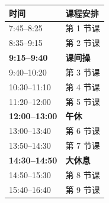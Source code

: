 \documentclass[a4paper]{article}
\begin{document}
\begin{appendices}
 \begin{tabular}{ll}
 \toprule
 \bf 时间 & \bf 课程安排 \\
 \midrule
 7:45--8:25 & 第 1 节课 \\
 8:35--9:15 & 第 2 节课 \\
 \midrule
 \bf 9:15--9:40 & \bf 课间操 \\
 \midrule
 9:40--10:20 & 第 3 节课 \\
 10:30--11:10 & 第 4 节课 \\
 11:20--12:00 & 第 5 节课 \\
 \midrule
 \bf 12:00--13:00 & \bf 午休 \\
 \midrule
 13:00--13:40 & 第 6 节课 \\
 13:50--14:30 & 第 7 节课 \\
 \midrule
 \bf 14:30--14:50 & \bf 大休息 \\
 \midrule
 14:50--15:30 & 第 8 节课 \\
 15:40--16:40 & 第 9 节课 \\
 \bottomrule
 \end{tabular}
\end{appendices}
\end{document}
